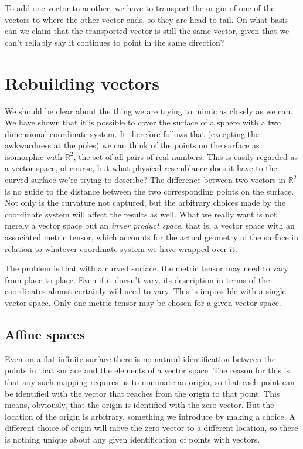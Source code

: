 To add one vector to another, we have to transport the origin of one of the vectors to where the other vector ends, so they are head-to-tail. On what basis can we claim that the transported vector is still the same vector, given that we can't reliably say it continues to point in the same direction?

\section{Rebuilding vectors}

We should be clear about the thing we are trying to mimic as closely as we can. We have shown that it is possible to cover the surface of a sphere with a two dimensional coordinate system. It therefore follows that (excepting the awkwardness at the poles) we can think of the points on the surface as isomorphic with $\mathbb{R}^2$, the set of all pairs of real numbers. This is easily regarded as a vector space, of course, but what physical resemblance does it have to the curved surface we're trying to describe? The difference between two vectors in $\mathbb{R}^2$ is no guide to the distance between the two corresponding points on the surface. Not only is the curvature not captured, but the arbitrary choices made by the coordinate system will affect the results as well. What we really want is not merely a vector space but an \textit{inner product space}, that is, a vector space with an associated metric tensor, which accounts for the actual geometry of the surface in relation to whatever coordinate system we have wrapped over it.

The problem is that with a curved surface, the metric tensor may need to vary from place to place. Even if it doesn't vary, its description in terms of the coordinates almost certainly will need to vary. This is impossible with a single vector space. Only one metric tensor may be chosen for a given vector space.

\subsection{Affine spaces}

Even on a flat infinite surface there is no natural identification between the points in that surface and the elements of a vector space. The reason for this is that any such mapping requires us to nominate an origin, so that each point can be identified with the vector that reaches from the origin to that point. This means, obviously, that the origin is identified with the zero vector. But the location of the origin is arbitrary, something we introduce by making a choice. A different choice of origin will move the zero vector to a different location, so there is nothing unique about any given identification of points with vectors.

